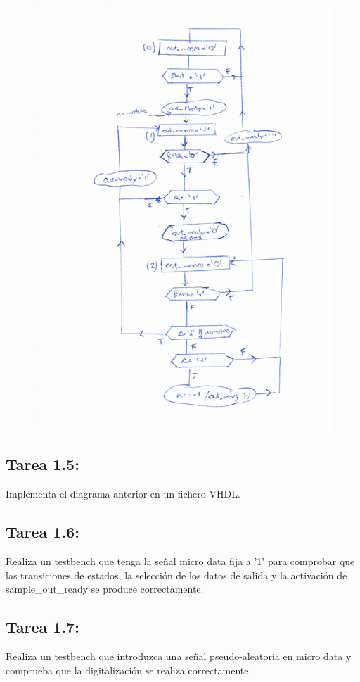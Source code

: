 \documentclass{article}
\begin{document}
\begin{figure}[H]
\centering
\includegraphics[width=0.9\linewidth]{images/1_4.png}
\end{figure}

\subsection{Tarea 1.5:}
Implementa el diagrama anterior en un fichero VHDL.

\subsection{Tarea 1.6:}
Realiza un testbench que tenga la señal micro data fija a '1' para comprobar que las transiciones de estados, la selección de los datos de salida y la activación de sample{\_}out{\_}ready se produce correctamente.

\subsection{Tarea 1.7:}
Realiza un testbench que introduzca una señal pseudo-aleatoria en micro data y comprueba que la digitalización se realiza correctamente.
\end{document}
